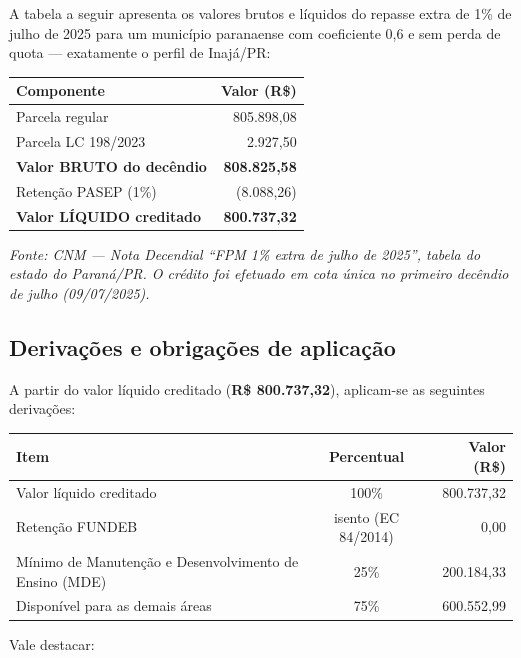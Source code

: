 \documentclass[12pt,a4paper]{article}
\begin{document}
A tabela a seguir apresenta os valores brutos e líquidos do repasse extra de 1\% de julho de 2025 para um município paranaense com coeficiente 0,6 e sem perda de quota --- exatamente o perfil de Inajá/PR:

\begin{center}
\renewcommand{\arraystretch}{1.3}
\begin{tabular}{@{}l r@{}}
\toprule
\textbf{Componente} & \textbf{Valor (R\$)} \\
\midrule
Parcela regular & 805.898,08 \\
Parcela LC 198/2023 & 2.927,50 \\
\textbf{Valor BRUTO do decêndio} & \textbf{808.825,58} \\
Retenção PASEP (1\%) & (8.088,26) \\
\textbf{Valor LÍQUIDO creditado} & \textbf{800.737,32} \\
\bottomrule
\end{tabular}
\end{center}

\smallskip
\textit{Fonte: CNM --- Nota Decendial ``FPM 1\% extra de julho de 2025'', tabela do estado do Paraná/PR. O crédito foi efetuado em cota única no primeiro decêndio de julho (09/07/2025).}

\subsection{Derivações e obrigações de aplicação}

A partir do valor líquido creditado (\textbf{R\$ 800.737,32}), aplicam-se as seguintes derivações:

\begin{center}
\renewcommand{\arraystretch}{1.3}
\begin{tabular}{@{}l c r@{}}
\toprule
\textbf{Item} & \textbf{Percentual} & \textbf{Valor (R\$)} \\
\midrule
Valor líquido creditado & 100\% & 800.737,32 \\
Retenção FUNDEB & isento (EC 84/2014) & 0,00 \\
Mínimo de Manutenção e Desenvolvimento de Ensino (MDE) & 25\% & 200.184,33 \\
Disponível para as demais áreas & 75\% & 600.552,99 \\
\bottomrule
\end{tabular}
\end{center}

\smallskip
Vale destacar:
\end{document}
